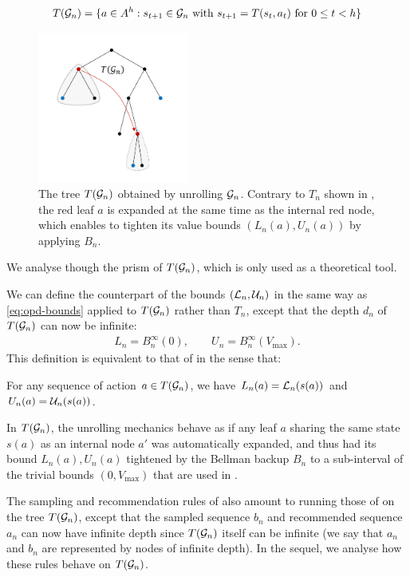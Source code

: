 \documentclass[runningheads]{llncs}
\begin{document}
\begin{equation}
T(\mathcal{G}_n) = \{a\in A^h: s_{t+1} \in \mathcal{G}_n \text{ with } s_{t+1} = T(s_{t}, a_t)\text{ for } 0 \leq t < h\}
\end{equation}

\begin{figure}[htp]
	\centering
	\includegraphics[trim={2.cm 1cm 2.5cm 1cm}, clip, width=0.44\textwidth]{img/tree_5.pdf}
	\caption{The tree $T(\mathcal{G}_n)$ obtained by unrolling $\mathcal{G}_n$. Contrary to $T_n$ shown in , the red leaf $a$ is expanded at the same time as the internal red node, which enables to tighten its value bounds $(L_n(a), U_n(a))$ by applying $B_n$.}
	\label{fig:unroll}
\end{figure}
We analyse \GBOPD though the prism of $T(\mathcal{G}_n)$, which is only used as a theoretical tool. 

We can define the counterpart of the bounds $(\mathcal{L}_n, \mathcal{U}_n)$ in the same way as \eqref{eq:opd-bounds} applied to $T(\mathcal{G}_n)$ rather than $T_n$, except that the depth $d_n$ of $T(\mathcal{G}_n)$ can now be infinite:
\begin{align}
\label{eq:gbop-t-bounds}
L_n = B_n^{\infty}(0), \qquad U_n = B_n^{\infty}(V_{\max}).
\end{align}
This definition is equivalent to that of \GBOPD in the sense that:
\begin{lemma}
	\label{lem:equivalence}
For any sequence of action $a\in T(\mathcal{G}_n)$, we have $L_n(a) = \mathcal{L}_n(s(a))$ and $U_n(a) = \mathcal{U}_n(s(a))$.	
\end{lemma}

In $T(\mathcal{G}_n)$, the unrolling mechanics behave as if any leaf $a$ sharing the same state $s(a)$ as an internal node $a'$ was automatically expanded, and thus had its bound $L_n(a), U_n(a)$ tightened by the Bellman backup $B_n$ to a sub-interval of the trivial bounds $(0, V_{\max})$ that are used in \OPD.

The sampling and recommendation rules of \GBOPD also amount to running those of \OPD on the tree $T(\mathcal{G}_n)$, except that the sampled sequence $b_n$ and recommended sequence $a_n$ can now have infinite depth since $T(\mathcal{G}_n)$ itself can be infinite (we say that $a_n$ and $b_n$ are represented by nodes of infinite depth). In the sequel, we analyse how these rules behave on $T(\mathcal{G}_n)$.
\end{document}
